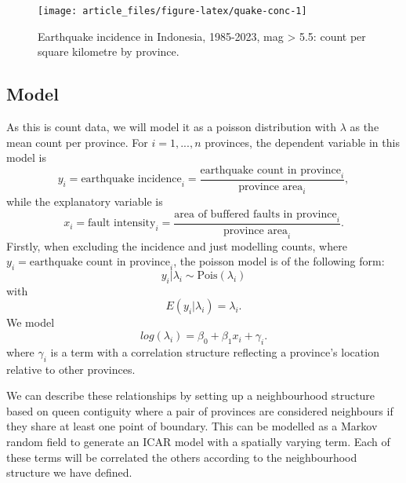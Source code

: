 \begin{figure}

{\centering \texttt{[image: article\_files/figure-latex/quake-conc-1]} 

}

\caption{Earthquake incidence in Indonesia, 1985-2023, mag > 5.5: count per square kilometre by province. }\label{fig:quake-conc}
\end{figure}

\hypertarget{model}{%
\subsection{Model}\label{model}}

As this is count data, we will model it as a poisson distribution with
\(\lambda\) as the mean count per province. For \(i = 1,...,n\) provinces,
the dependent variable in this model is
\begin{equation}
y_i = \text{earthquake incidence}_i = \frac{\text{earthquake count in province}_i} {\text{province area}_i}, 
\label{eq:eq1}
\end{equation}
while the explanatory variable is
\begin{equation}
x_i = \text{fault intensity}_i = \frac{\text{area of buffered faults in province}_i} {\text{province area}_i}.
\label{eq:eq2}
\end{equation}
Firstly, when excluding the incidence and just modelling counts, where
\(y_i = \text{earthquake count in province}_i\), the poisson model is of
the following form:
\begin{equation}
y_i | \lambda_i \sim \text{Pois}(\lambda_i)
\label{eq:eq3}
\end{equation}
with
\begin{equation}
E(y_i | \lambda_i) = \lambda_i.
\label{eq:eq4}
\end{equation}
We model
\begin{equation}
log(\lambda_i) = \beta_0 + \beta_1x_i + \gamma_i.
\label{eq:eq5}
\end{equation}
where \(\gamma_i\)
is a term with a correlation structure reflecting a province's location
relative to other provinces.

We can describe these relationships by setting up a neighbourhood
structure based on queen contiguity where a pair of provinces are
considered neighbours if they share at least one point of boundary. This can be modelled as a Markov random field to generate an ICAR model with a spatially varying term. Each of these terms will be correlated the others according to the neighbourhood structure we have defined.

